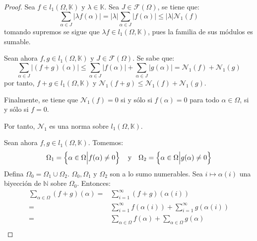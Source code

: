 \documentclass[12pt]{report}
\newcounter{it}
\theoremstyle{largebreak}
\newcommand\abs[1]{\ensuremath{\big|#1\big|}}
\begin{document}
    \begin{proof}
        Sea $f\in l_1(\Omega,\mathbb{K})$ y $\lambda\in\mathbb{K}$. Sea $J\in\mathcal{F}(\Omega)$, se tiene que:
        \begin{equation*}
            \sum_{\alpha\in J }\abs{\lambda f(\alpha)}=\abs{\lambda} \sum_{\alpha\in J }\abs{f(\alpha)}\leq\abs{\lambda}\mathcal{N}_1(f)
        \end{equation*}
        tomando supremos se sigue que $\lambda f\in l_1(\Omega,\mathbb{K})$, pues la familia de sus módulos es sumable.

        Sean ahora $f,g\in l_1(\Omega,\mathbb{K})$ y $J\in\mathcal{F}(\Omega)$. Se sabe que:
        \begin{equation*}
            \sum_{\alpha\in J }\abs{(f+g)(\alpha)}\leq \sum_{\alpha\in J }\abs{f(\alpha)}+\sum_{\alpha\in J }\abs{g(\alpha)}=\mathcal{N}_1(f)+\mathcal{N}_1(g)
        \end{equation*}
        por tanto, $f+g\in l_1(\Omega,\mathbb{K})$ y $\mathcal{N}_1(f+g)\leq\mathcal{N}_1(f)+\mathcal{N}_1(g)$.

        Finalmente, se tiene que $\mathcal{N}_1(f)=0$ si y sólo si $f(\alpha)=0$ para todo $\alpha\in\Omega$, si y sólo si $f=0$.

        Por tanto, $\mathcal{N}_1$ es una norma sobre $l_1(\Omega,\mathbb{K})$.

        Sean ahora $f,g\in l_1(\Omega,\mathbb{K})$. Tomemos:
        \begin{equation*}
            \Omega_1=\left\{\alpha\in\Omega\Big|f(\alpha)\neq0 \right\}\quad\textup{y}\quad\Omega_2=\left\{\alpha\in\Omega\Big|g(\alpha)\neq0 \right\}
        \end{equation*}
        Defina $\Omega_0=\Omega_1\cup\Omega_2$. $\Omega_0,\Omega_1$ y $\Omega_2$ son a lo sumo numerables. Sea $i\mapsto\alpha(i)$ una biyección de $\mathbb{N}$ sobre $\Omega_0$. Entonces:
        \begin{equation*}
            \begin{split}
                \sum_{\alpha\in\Omega }(f+g)(\alpha)=&\sum_{i=1 }^\infty(f+g)(\alpha(i))\\
                =&\sum_{i=1 }^\infty f(\alpha(i))+\sum_{i=1 }^\infty g(\alpha(i))\\
                =&\sum_{\alpha\in\Omega }f(\alpha)+\sum_{\alpha\in\Omega }g(\alpha)\\
            \end{split}
        \end{equation*}
    \end{proof}
\end{document}
